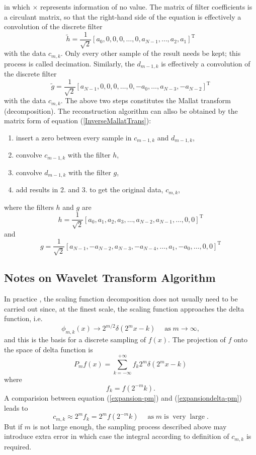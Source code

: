 \documentclass{book}
\newcommand{\Tau}{\mathrm{T}}
\newcommand{\tmop}[1]{\ensuremath{\operatorname{#1}}}
\begin{document}
in which $\times$ represents information of no value. The matrix of filter
coefficients is a circulant matrix, so that the right-hand side of the
equation is effectively a convolution of the discrete filter
\[ \tilde{h} = \frac{1}{\sqrt{2}} [a_0, 0, 0, 0, \ldots, 0, a_{N - 1}, \ldots,
   a_2, a_1]^{\Tau} \]
with the data $c_{m, k}$. Only every other sample of the result needs be kept;
this process is called decimation. Similarly, the $d_{m - 1, k}$ is
effectively a convolution of the discrete filter
\[ \tilde{g} = \frac{1}{\sqrt{2}} [a_{N - 1}, 0, 0, 0, \ldots, 0, - a_0,
   \ldots, a_{N - 3}, - a_{N - 2}]^{\Tau} \]
with the data $c_{m, k}$. The above two steps constitutes the Mallat transform
(decomposition). The reconstruction algorithm can allso be obtained by the
matrix form of equation (\ref{InverseMallatTrans}):
\begin{enumerate}
  \item insert a zero between every sample in $c_{m - 1, k}$ and $d_{m - 1,
  k}$,
  
  \item convolve $c_{m - 1, k}$ with the filter $h$,
  
  \item convolve $d_{m - 1, k}$ with the filter $g$,
  
  \item add results in 2. and 3. to get the original data, $c_{m, k}$,
\end{enumerate}
where the filters $h$ and $g$ are
\[ h = \frac{1}{\sqrt{2}} [a_0, a_1, a_2, a_3, \ldots, a_{N - 2}, a_{N - 1},
   \ldots, 0, 0]^{\Tau} \]
and
\[ g = \frac{1}{\sqrt{2}} [a_{N - 1}, - a_{N - 2}, a_{N - 3}, - a_{N - 4},
   \ldots, a_1, - a_0, \ldots, 0, 0]^{\Tau} \]

\subsection{Notes on Wavelet Transform Algorithm}

In practice {\cite{williams1994introduction}}, the scaling function
decomposition does not usually need to be carried out since, at the finest
scale, the scaling function approaches the delta function, i.e.
\[ \phi_{m, k} (x) \rightarrow 2^{m / 2} \delta (2^m x - k) \quad \tmop{as} m
   \rightarrow \infty, \]
and this is the basis for a discrete sampling of $f (x)$. The projection of
$f$ onto the space of delta function is
\begin{equation}
  P_m f (x) = \sum_{k = - \infty}^{+ \infty} f_k 2^m \delta (2^m x - k)_{}
  \label{expansiondelta-pm}
\end{equation}
where
\[ f_k = f (2^{- m} k) . \]
A comparision between equation (\ref{expansion-pm}) and
(\ref{expansiondelta-pm}) leads to
\[ c_{m, k} \approx 2^m f_k = 2^m f (2^{- m} k) \quad \tmop{as} m \tmop{is}
   \tmop{very} \tmop{large} . \]
But if $m$ is not large enough, the sampling process described above may
introduce extra error in which case the integral according to definition of
$c_{m, k}$ is required.
\end{document}
